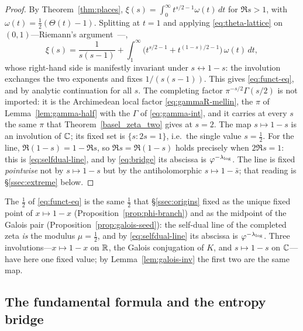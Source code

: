 \begin{proof}
By Theorem~\ref{thm:places}, $\xi(s)=\int_{0}^{\infty}t^{s/2-1}\omega(t)\,dt$ for $\Re s>1$, with
$\omega(t)=\tfrac12(\Theta(t)-1)$. Splitting at $t=1$ and applying \eqref{eq:theta-lattice} on
$(0,1)$---Riemann's argument~\cite{Riemann1859}---,
\begin{equation}\label{eq:xi-split}
  \xi(s)=\frac{1}{s(s-1)}
        +\int_{1}^{\infty}\!\big(t^{s/2-1}+t^{(1-s)/2-1}\big)\,\omega(t)\,dt ,
\end{equation}
whose right-hand side is manifestly invariant under $s\leftrightarrow1-s$: the involution exchanges
the two exponents and fixes $1/(s(s-1))$. This gives \eqref{eq:funct-eq}, and by analytic
continuation for all $s$. The completing factor $\pi^{-s/2}\Gamma(s/2)$ is not imported: it is the
Archimedean local factor \eqref{eq:gammaR-mellin}, the $\pi$ of Lemma~\ref{lem:gamma-half} with the
$\Gamma$ of \eqref{eq:gamma-int}, and it carries at every $s$ the same $\pi$ that
Theorem~\ref{basel_zeta_two} gives at $s=2$. The map $s\mapsto1-s$ is an involution of $\mathbb{C}$; its fixed
set is $\{s:2s=1\}$, i.e.\ the single value $s=\tfrac12$. For the line, $\Re(1-s)=1-\Re s$, so
$\Re s=\Re(1-s)$ holds precisely when $2\Re s=1$: this is \eqref{eq:selfdual-line}, and by
\eqref{eq:bridge} its abscissa is $\varphi^{-\lambda_{\log}}$. The line is fixed \emph{pointwise} not by
$s\mapsto1-s$ but by the antiholomorphic $s\mapsto1-\bar s$; that reading is
\S\ref{ssec:extreme} below.
\end{proof}

\begin{remark}\label{rmk:half-selfdual}
The $\tfrac12$ of \eqref{eq:funct-eq} is the same $\tfrac12$ that \S\ref{ssec:origins} fixed as
the unique fixed point of $x\mapsto1-x$ (Proposition~\ref{prop:phi-branch}) and as the midpoint
of the Galois pair (Proposition~\ref{prop:galois-seed}): the self-dual line of the completed
zeta \emph{is} the modulus $\mu=\tfrac12$, and by \eqref{eq:selfdual-line} its abscissa is
$\varphi^{-\lambda_{\log}}$. Three involutions---$x\mapsto1-x$ on $\mathbb{R}$, the Galois conjugation of $K$, and
$s\mapsto1-s$ on $\mathbb{C}$---have here one fixed value; by Lemma~\ref{lem:galois-inv} the first two
are the same map.
\end{remark}

\subsection{The fundamental formula and the entropy bridge}\label{ssec:L1}

